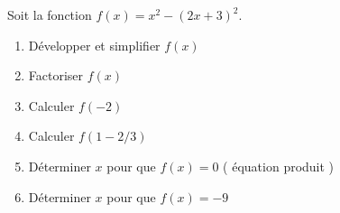 
\begin{exercice}\label{exoSeconde-0052}

    Soit la fonction \( f(x)=x^2-(2x+3)^2\).
    \begin{enumerate}
        \item
 Développer et simplifier $f(x)$
 \item
 Factoriser $f(x)$
\item
 Calculer $f(-2)$ 
 \item
 Calculer $f(1-2/3)$
 \item
 Déterminer $x$ pour que $f(x)=0$ ( équation produit ) 
 \item
 Déterminer $x$ pour que $f(x)=-9$
            
    \end{enumerate}

\end{exercice}
